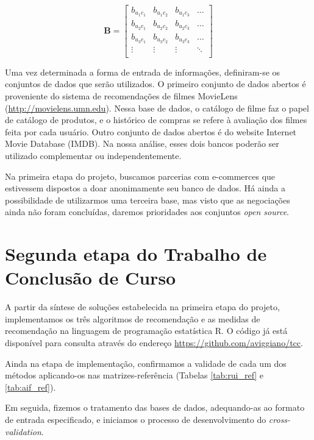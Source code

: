 \begin{equation}
	\mathbf{B} = 
\begin{bmatrix} 
 b_{u_1 c_1} &  b_{u_1 c_2} &  b_{u_1 c_3}  & \dots   \\
 b_{u_2 c_1} &  b_{u_2 c_2} &  b_{u_2 c_3}  & \dots   \\
 b_{u_3 c_1} &  b_{u_3 c_2} &  b_{u_3 c_3}  & \dots  \\ 
 \vdots &  \vdots &  \vdots  & \ddots   \\
 \end{bmatrix}
\end{equation}

Uma vez determinada a forma de entrada de informações, definiram-se os conjuntos de dados que serão utilizados. O primeiro conjunto de dados abertos é proveniente do sistema de recomendações de filmes MovieLens (\url{http://movielens.umn.edu}). Nessa base de dados, o catálogo de filme faz o papel de catálogo de produtos, e o histórico de compras se refere à avaliação dos filmes feita por cada usuário. Outro conjunto de dados abertos é do website Internet Movie Database (IMDB). Na nossa análise, esses dois bancos poderão ser utilizado complementar ou independentemente.

Na primeira etapa do projeto, buscamos parcerias com e-commerces que estivessem dispostos a doar anonimamente seu banco de dados. Há ainda a possibilidade de utilizarmos uma terceira base, mas visto que as negociações ainda não foram concluídas, daremos prioridades aos conjuntos \textit{open source}.  

\section{Segunda etapa do Trabalho de Conclusão de Curso} %
\label{sec:segunda_etapa_do_trabalho_de_conclus_o_de_curso}


A partir da síntese de soluções estabelecida na primeira etapa do projeto, implementamos os três algoritmos de recomendação e as medidas de recomendação na linguagem de programação estatística R. O código já está disponível para consulta através do endereço \url{https://github.com/aviggiano/tcc}.

Ainda na etapa de implementação, confirmamos a validade de cada um dos métodos aplicando-os nas matrizes-referência (Tabelas \ref{tab:rui_ref} e \ref{tab:aif_ref}). 

Em seguida, fizemos o tratamento das bases de dados, adequando-as ao formato de entrada especificado, e  iniciamos o processo de desenvolvimento do \textit{cross-validation}.

